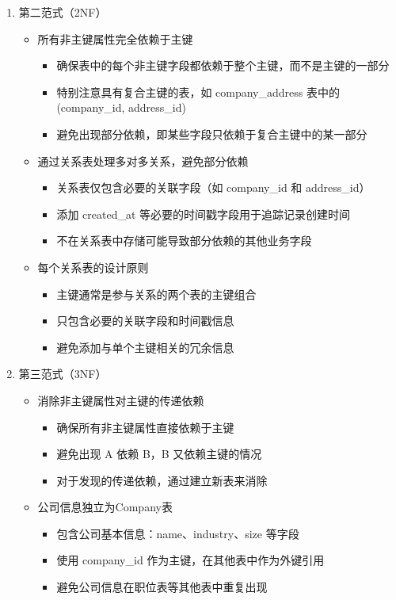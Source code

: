 \begin{enumerate}
  \item 第二范式（2NF）
  \begin{itemize}
    \item 所有非主键属性完全依赖于主键
    \begin{itemize}
      \item 确保表中的每个非主键字段都依赖于整个主键，而不是主键的一部分
      \item 特别注意具有复合主键的表，如 company\_address 表中的 (company\_id, address\_id)
      \item 避免出现部分依赖，即某些字段只依赖于复合主键中的某一部分
    \end{itemize}

    \item 通过关系表处理多对多关系，避免部分依赖
    \begin{itemize}
      \item 关系表仅包含必要的关联字段（如 company\_id 和 address\_id）
      \item 添加 created\_at 等必要的时间戳字段用于追踪记录创建时间
      \item 不在关系表中存储可能导致部分依赖的其他业务字段
    \end{itemize}

    \item 每个关系表的设计原则
    \begin{itemize}
      \item 主键通常是参与关系的两个表的主键组合
      \item 只包含必要的关联字段和时间戳信息
      \item 避免添加与单个主键相关的冗余信息
    \end{itemize}
  \end{itemize}

  \item 第三范式（3NF）
  \begin{itemize}
    \item 消除非主键属性对主键的传递依赖
    \begin{itemize}
      \item 确保所有非主键属性直接依赖于主键
      \item 避免出现 A 依赖 B，B 又依赖主键的情况
      \item 对于发现的传递依赖，通过建立新表来消除
    \end{itemize}

    \item 公司信息独立为Company表
    \begin{itemize}
      \item 包含公司基本信息：name、industry、size 等字段
      \item 使用 company\_id 作为主键，在其他表中作为外键引用
      \item 避免公司信息在职位表等其他表中重复出现
    \end{itemize}


\end{itemize}
\end{enumerate}
